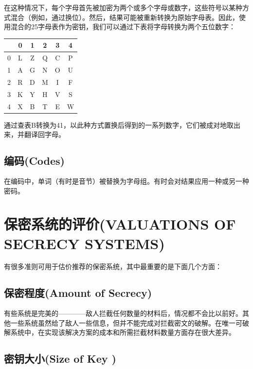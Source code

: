 \documentclass[]{article}
\begin{document}
在这种情况下，每个字母首先被加密为两个或多个字母或数字，这些符号以某种方式混合（例如，通过换位）。然后，结果可能被重新转换为原始字母表。因此，使用混合的25字母表作为密钥，我们可以通过下表将字母转换为两个五位数字：
\begin{center}
	\begin{tabular}{c|c|c|c|c|c}
		
		& 0 & 1 & 2 & 3 & 4 \\ 
		\hline 
		0&L  & Z & Q & C & P \\ 
		\hline 
		1&A  & G & N & O & U \\ 
		\hline 
		2& R & D &M  & I & F \\ 
		\hline 
		3& K & Y & H & V & S \\ 
		\hline 
		4& X & B & T & E & W \\ 
		
	\end{tabular} 
\end{center}


通过查表B转换为41，以此种方式置换后得到的一系列数字，它们被成对地取出来，并翻译回字母。

\subsection{编码(Codes)}
在编码中，单词（有时是音节）被替换为字母组。有时会对结果应用一种或另一种密码。

\newpage

%   
%

\section{保密系统的评价(VALUATIONS OF SECRECY SYSTEMS)}

有很多准则可用于估价推荐的保密系统，其中最重要的是下面几个方面：

\subsection{保密程度(Amount of Secrecy)}
有些系统是完美的————敌人拦截任何数量的材料后，情况都不会比以前好。其他一些系统虽然给了敌人一些信息，但并不能完成对拦截密文的破解。在唯一可破解系统中，在实现该解决方案的成本和所需拦截材料数量方面存在很大差异。

\subsection{密钥大小(Size of Key )}
\end{document}
